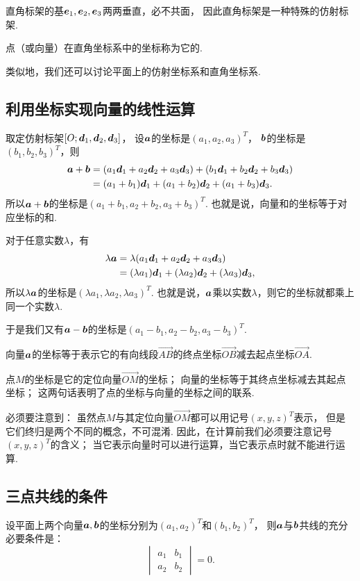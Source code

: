 直角标架的基\(\boldsymbol{e}_1,\boldsymbol{e}_2,\boldsymbol{e}_3\)两两垂直，必不共面，
因此直角标架是一种特殊的仿射标架.

点（或向量）在直角坐标系中的坐标称为它的.

类似地，我们还可以讨论平面上的仿射坐标系和直角坐标系.

\subsection{利用坐标实现向量的线性运算}
取定仿射标架\([O;\boldsymbol{d}_1,\boldsymbol{d}_2,\boldsymbol{d}_3]\)，
设\(\boldsymbol{a}\)的坐标是\((a_1,a_2,a_3)^T\)，
\(\boldsymbol{b}\)的坐标是\((b_1,b_2,b_3)^T\)，则\begin{align*}
\boldsymbol{a}+\boldsymbol{b}
&= (a_1 \boldsymbol{d}_1 + a_2 \boldsymbol{d}_2 + a_3 \boldsymbol{d}_3)
+ (b_1 \boldsymbol{d}_1 + b_2 \boldsymbol{d}_2 + b_3 \boldsymbol{d}_3) \\
&= (a_1 + b_1) \boldsymbol{d}_1 + (a_1 + b_2) \boldsymbol{d}_2 + (a_1 + b_3) \boldsymbol{d}_3.
\end{align*}
所以\(\boldsymbol{a}+\boldsymbol{b}\)的坐标是\((a_1+b_1,a_2+b_2,a_3+b_3)^T\).
也就是说，向量和的坐标等于对应坐标的和.

对于任意实数\(\lambda\)，有\begin{align*}
	\lambda \boldsymbol{a}
	&= \lambda (a_1 \boldsymbol{d}_1 + a_2 \boldsymbol{d}_2 + a_3 \boldsymbol{d}_3) \\
	&= (\lambda a_1) \boldsymbol{d}_1 + (\lambda a_2) \boldsymbol{d}_2 + (\lambda a_3) \boldsymbol{d}_3,
\end{align*}
所以\(\lambda \boldsymbol{a}\)的坐标是\((\lambda a_1,\lambda a_2,\lambda a_3)^T\).
也就是说，\(\boldsymbol{a}\)乘以实数\(\lambda\)，则它的坐标就都乘上同一个实数\(\lambda\).

于是我们又有\(\boldsymbol{a}-\boldsymbol{b}\)的坐标是\((a_1-b_1,a_2-b_2,a_3-b_3)^T\).

\begin{theorem}
向量\(\boldsymbol{a}\)的坐标等于表示它的有向线段\(\vec{AB}\)的终点坐标\(\vec{OB}\)减去起点坐标\(\vec{OA}\).
\end{theorem}

点\(M\)的坐标是它的定位向量\(\vec{OM}\)的坐标；
向量的坐标等于其终点坐标减去其起点坐标；
这两句话表明了点的坐标与向量的坐标之间的联系.

必须要注意到：
虽然点\(M\)与其定位向量\(\vec{OM}\)都可以用记号\((x,y,z)^T\)表示，
但是它们终归是两个不同的概念，不可混淆.
因此，在计算前我们必须要注意记号\((x,y,z)^T\)的含义；
当它表示向量时可以进行运算，当它表示点时就不能进行运算.

\subsection{三点共线的条件}
\begin{theorem}\label{theorem:解析几何.平面上两向量共线的充分必要条件}
设平面上两个向量\(\boldsymbol{a},\boldsymbol{b}\)的坐标分别为\((a_1,a_2)^T\)和\((b_1,b_2)^T\)，
则\(\boldsymbol{a}\)与\(\boldsymbol{b}\)共线的充分必要条件是：\[
\begin{vmatrix}
	a_1 & b_1 \\
	a_2 & b_2
\end{vmatrix} = 0.
\]
\end{theorem}

